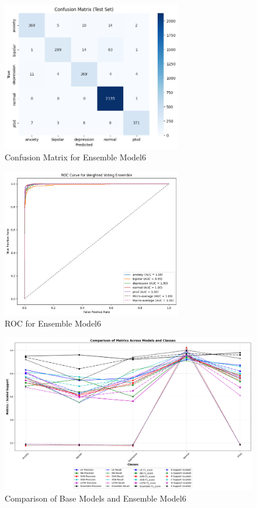 \begin{figure}[h!]  
    \centering
    \includegraphics[width=0.7\textwidth]{Images/WV CM.png}  
    \caption{Confusion Matrix for Ensemble Model6}
    \label{lstm arch}  %
\end{figure}

\begin{figure}[h!]  
    \centering
    \includegraphics[width=0.7\textwidth]{Images/WV ROC.png}  
    \caption{ROC for Ensemble Model6}
    \label{lstm arch}  %
\end{figure}

\begin{figure}[h!]  
    \centering
    \includegraphics[width=1.00\textwidth]{Images/WV RESULT.png}  
    \caption{Comparison of Base Models and Ensemble Model6}
    \label{lstm arch}  %
\end{figure}

